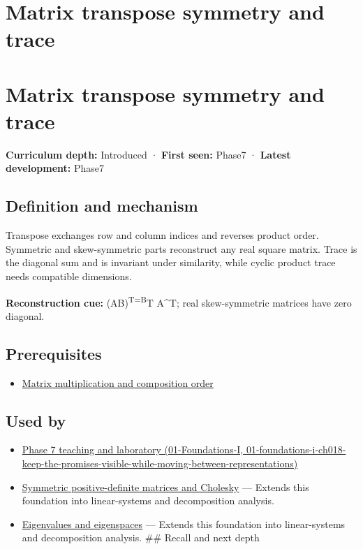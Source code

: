 \hypertarget{appendix-175ca5ff874d}{}
\section*{Matrix transpose symmetry and trace}
\section{Matrix transpose symmetry and trace}\label{appendix-175ca5ff874d-matrix-transpose-symmetry-and-trace}

\textbf{Curriculum depth:} Introduced · \textbf{First seen:} Phase7 · \textbf{Latest development:} Phase7

\subsection{Definition and mechanism}\label{appendix-175ca5ff874d-definition-and-mechanism}

Transpose exchanges row and column indices and reverses product order. Symmetric and skew-symmetric parts reconstruct any real square matrix. Trace is the diagonal sum and is invariant under similarity, while cyclic product trace needs compatible dimensions.

\textbf{Reconstruction cue:} (AB)\textsuperscript{T=B}T A\^{}T; real skew-symmetric matrices have zero diagonal.

\subsection{Prerequisites}\label{appendix-175ca5ff874d-prerequisites}

\begin{itemize}
\tightlist
\item
  \hyperref[appendix-ab31ef447dbf]{Matrix multiplication and composition order}
\end{itemize}

\subsection{Used by}\label{appendix-175ca5ff874d-used-by}

\begin{itemize}
\tightlist
\item
  \href{../01-Foundations-I/main.pdf\#nameddest=01-foundations-i-ch018-keep-the-promises-visible-while-moving-between-representations}{Phase 7 teaching and laboratory (01-Foundations-I, 01-foundations-i-ch018-keep-the-promises-visible-while-moving-between-representations)}
\item
  \hyperref[appendix-50d2ea3c9b26]{Symmetric positive-definite matrices and Cholesky} --- Extends this foundation into linear-systems and decomposition analysis.
\item
  \hyperref[appendix-0b3be18411f9]{Eigenvalues and eigenspaces} --- Extends this foundation into linear-systems and decomposition analysis. \#\# Recall and next depth
\end{itemize}

